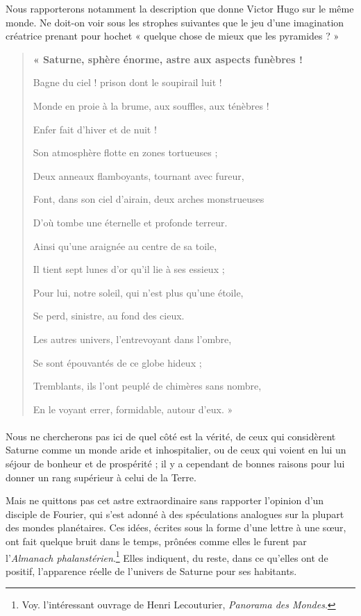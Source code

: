 \documentclass[a4paper, 11pt, oneside, landscape]{article}
\begin{document}
Nous rapporterons notamment la description que donne Victor Hugo sur le même monde. Ne doit-on voir sous les strophes suivantes que le jeu d'une imagination créatrice prenant pour hochet « quelque chose de mieux que les pyramides ? »
\begin{quotation}\bfseries\small
« Saturne, sphère énorme, astre aux aspects funèbres !

Bagne du ciel ! prison dont le soupirail luit !

Monde en proie à la brume, aux souffles, aux ténèbres !

\hspace*{5mm}Enfer fait d'hiver et de nuit !

\bigskip

Son atmosphère flotte en zones tortueuses ;

Deux anneaux flamboyants, tournant avec fureur,

Font, dans son ciel d'airain, deux arches monstrueuses

D'où tombe une éternelle et profonde terreur.

\bigskip

Ainsi qu'une araignée au centre de sa toile,

Il tient sept lunes d'or qu'il lie à ses essieux ;

Pour lui, notre soleil, qui n'est plus qu'une étoile,

\hspace*{5mm}Se perd, sinistre, au fond des cieux.

\bigskip

Les autres univers, l'entrevoyant dans l'ombre,

Se sont épouvantés de ce globe hideux ;

Tremblants, ils l'ont peuplé de chimères sans nombre,

En le voyant errer, formidable, autour d'eux. »
\end{quotation}
\paragraph{}
Nous ne chercherons pas ici de quel côté est la vérité, de ceux qui considèrent Saturne comme un monde aride et inhospitalier, ou de ceux qui voient en lui un séjour de bonheur et de prospérité ; il y a cependant de bonnes raisons pour lui donner un rang supérieur à celui de la Terre.

Mais ne quittons pas cet astre extraordinaire sans rapporter l'opinion d'un disciple de Fourier, qui s'est adonné à des spéculations analogues sur la plupart des mondes planétaires. Ces idées, écrites sous la forme d'une lettre à une sœur, ont fait quelque bruit dans le temps, prônées comme elles le furent par l'\emph{Almanach phalanstérien}.\footnote{Voy. l'intéressant ouvrage de Henri Lecouturier, \emph{Panorama des Mondes}.} Elles indiquent, du reste, dans ce qu'elles ont de positif, l'apparence réelle de l'univers de Saturne pour ses habitants.
\end{document}
